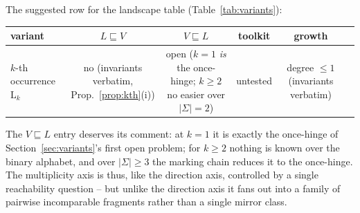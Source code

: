 The suggested row for the landscape table
(Table~\ref{tab:variants}):

\begin{center}
\begin{tabular}{lccccc}
    variant & $L \sqsubseteq V$ & $V \sqsubseteq L$ & toolkit & growth \\
    \hline
    $k$-th occurrence $\mathrm{L}_k$ & no (invariants verbatim,
    Prop.~\ref{prop:kth}(i)) & open ($k = 1$ \emph{is} the once-hinge;
    $k \geq 2$ no easier over $|\Sigma| = 2$) & untested & degree
    $\leq 1$ (invariants verbatim) \\
\end{tabular}
\end{center}

The $V \sqsubseteq L$ entry deserves its comment: at $k = 1$ it is
exactly the once-hinge of Section~\ref{sec:variants}'s first open
problem; for $k \geq 2$ nothing is known over the binary alphabet, and
over $|\Sigma| \geq 3$ the marking chain reduces it to the once-hinge.
The multiplicity axis is thus, like the direction axis, controlled by
a single reachability question -- but unlike the direction axis it
fans out into a family of pairwise incomparable fragments rather than
a single mirror class.
